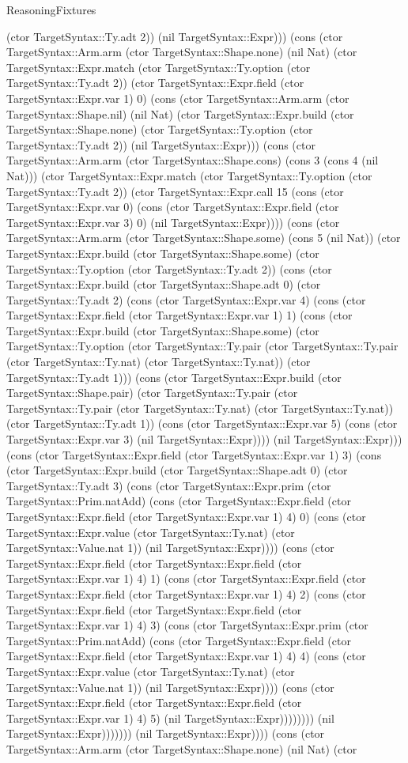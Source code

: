 \begin{lexlean}{ReasoningFixtures}
\begin{semanticmodule}
{(ctor TargetSyntax::Ty.adt 2)) (nil TargetSyntax::Expr))) (cons (ctor TargetSyntax::Arm.arm (ctor TargetSyntax::Shape.none) (nil Nat) (ctor TargetSyntax::Expr.match (ctor TargetSyntax::Ty.option (ctor TargetSyntax::Ty.adt 2)) (ctor TargetSyntax::Expr.field (ctor TargetSyntax::Expr.var 1) 0) (cons (ctor TargetSyntax::Arm.arm (ctor TargetSyntax::Shape.nil) (nil Nat) (ctor TargetSyntax::Expr.build (ctor TargetSyntax::Shape.none) (ctor TargetSyntax::Ty.option (ctor TargetSyntax::Ty.adt 2)) (nil TargetSyntax::Expr))) (cons (ctor TargetSyntax::Arm.arm (ctor TargetSyntax::Shape.cons) (cons 3 (cons 4 (nil Nat))) (ctor TargetSyntax::Expr.match (ctor TargetSyntax::Ty.option (ctor TargetSyntax::Ty.adt 2)) (ctor TargetSyntax::Expr.call 15 (cons (ctor TargetSyntax::Expr.var 0) (cons (ctor TargetSyntax::Expr.field (ctor TargetSyntax::Expr.var 3) 0) (nil TargetSyntax::Expr)))) (cons (ctor TargetSyntax::Arm.arm (ctor TargetSyntax::Shape.some) (cons 5 (nil Nat)) (ctor TargetSyntax::Expr.build (ctor TargetSyntax::Shape.some) (ctor TargetSyntax::Ty.option (ctor TargetSyntax::Ty.adt 2)) (cons (ctor TargetSyntax::Expr.build (ctor TargetSyntax::Shape.adt 0) (ctor TargetSyntax::Ty.adt 2) (cons (ctor TargetSyntax::Expr.var 4) (cons (ctor TargetSyntax::Expr.field (ctor TargetSyntax::Expr.var 1) 1) (cons (ctor TargetSyntax::Expr.build (ctor TargetSyntax::Shape.some) (ctor TargetSyntax::Ty.option (ctor TargetSyntax::Ty.pair (ctor TargetSyntax::Ty.pair (ctor TargetSyntax::Ty.nat) (ctor TargetSyntax::Ty.nat)) (ctor TargetSyntax::Ty.adt 1))) (cons (ctor TargetSyntax::Expr.build (ctor TargetSyntax::Shape.pair) (ctor TargetSyntax::Ty.pair (ctor TargetSyntax::Ty.pair (ctor TargetSyntax::Ty.nat) (ctor TargetSyntax::Ty.nat)) (ctor TargetSyntax::Ty.adt 1)) (cons (ctor TargetSyntax::Expr.var 5) (cons (ctor TargetSyntax::Expr.var 3) (nil TargetSyntax::Expr)))) (nil TargetSyntax::Expr))) (cons (ctor TargetSyntax::Expr.field (ctor TargetSyntax::Expr.var 1) 3) (cons (ctor TargetSyntax::Expr.build (ctor TargetSyntax::Shape.adt 0) (ctor TargetSyntax::Ty.adt 3) (cons (ctor TargetSyntax::Expr.prim (ctor TargetSyntax::Prim.natAdd) (cons (ctor TargetSyntax::Expr.field (ctor TargetSyntax::Expr.field (ctor TargetSyntax::Expr.var 1) 4) 0) (cons (ctor TargetSyntax::Expr.value (ctor TargetSyntax::Ty.nat) (ctor TargetSyntax::Value.nat 1)) (nil TargetSyntax::Expr)))) (cons (ctor TargetSyntax::Expr.field (ctor TargetSyntax::Expr.field (ctor TargetSyntax::Expr.var 1) 4) 1) (cons (ctor TargetSyntax::Expr.field (ctor TargetSyntax::Expr.field (ctor TargetSyntax::Expr.var 1) 4) 2) (cons (ctor TargetSyntax::Expr.field (ctor TargetSyntax::Expr.field (ctor TargetSyntax::Expr.var 1) 4) 3) (cons (ctor TargetSyntax::Expr.prim (ctor TargetSyntax::Prim.natAdd) (cons (ctor TargetSyntax::Expr.field (ctor TargetSyntax::Expr.field (ctor TargetSyntax::Expr.var 1) 4) 4) (cons (ctor TargetSyntax::Expr.value (ctor TargetSyntax::Ty.nat) (ctor TargetSyntax::Value.nat 1)) (nil TargetSyntax::Expr)))) (cons (ctor TargetSyntax::Expr.field (ctor TargetSyntax::Expr.field (ctor TargetSyntax::Expr.var 1) 4) 5) (nil TargetSyntax::Expr)))))))) (nil TargetSyntax::Expr))))))) (nil TargetSyntax::Expr)))) (cons (ctor TargetSyntax::Arm.arm (ctor TargetSyntax::Shape.none) (nil Nat) (ctor }
\end{semanticmodule}
\end{lexlean}
